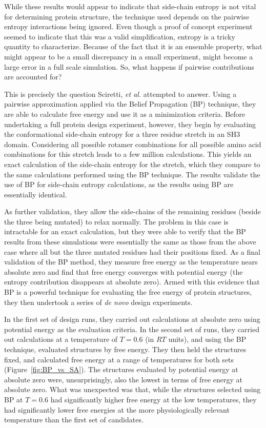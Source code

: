 While these results would appear to indicate that side-chain entropy is not vital for determining protein structure, the technique used depends on the pairwise entropy interactions being ignored. Even though a proof of concept experiment seemed to indicate that this was a valid simplification, entropy is a tricky quantity to characterize. Because of the fact that it is an ensemble property, what might appear to be a small discrepancy in a small experiment, might become a large error in a full scale simulation. So, what happens if pairwise contributions are accounted for?

This is precisely the question Sciretti, \emph{et al.} attempted to answer\cite{Sciretti:2008p361}. Using a pairwise approximation applied via the Belief Propagation (BP) technique, they are able to calculate free energy and use it as a minimization criteria. Before undertaking a full protein design experiment, however, they begin by evaluating the conformational side-chain entropy for a three residue stretch in an SH3 domain. Considering all possible rotamer combinations for all possible amino acid combinations for this stretch leads to a few million calculations. This yields an exact calculation of the side-chain entropy for the stretch, which they compare to the same calculations performed using the BP technique. The results validate the use of BP for side-chain entropy calculations, as the results using BP are essentially identical.

As further validation, they allow the side-chains of the remaining residues (beside the three being mutated) to relax normally. The problem in this case is intractable for an exact calculation, but they were able to verify that the BP results from these simulations were essentially the same as those from the above case where all but the three mutated residues had their positions fixed. As a final validation of the BP method, they measure free energy as the temperature nears absolute zero and find that free energy converges with potential energy (the entropy contribution disappears at absolute zero). Armed with this evidence that BP is a powerful technique for evaluating the free energy of protein structures, they then undertook a series of \emph{de novo} design experiments.

In the first set of design runs, they carried out calculations at absolute zero using potential energy as the evaluation criteria. In the second set of runs, they carried out calculations at a temperature of $T=0.6$ (in $RT$ units), and using the BP technique, evaluated structures by free energy. They then held the structures fixed, and calculated free energy at a range of temperatures for both sets (Figure~\ref{fig:BP_vs_SA}). The structures evaluated by potential energy at absolute zero were, unsurprisingly, also the lowest in terms of free energy at absolute zero. What was unexpected was that, while the structures selected using BP at $T=0.6$ had significantly higher free energy at the low temperatures, they had significantly lower free energies at the more physiologically relevant temperature than the first set of candidates.

